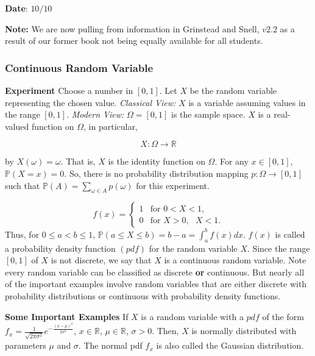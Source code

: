 \documentclass[12pt]{article}
\newcommand{\R}{\mathbb{R}}
\newcommand{\prob}[1]{\mathbb{P}(#1)}
\begin{document}
\begin{flushright}
\textbf{Date}: $10/10$
\end{flushright}

\textbf{Note:} We are now pulling from information in Grinstead and Snell, $v2.2$ as a result of our former book not being equally available for all students.

\subsubsection*{Continuous Random Variable} 

\begin{tcolorbox}
\textbf{Experiment} Choose a number in $[0,1]$. Let $X$ be the random variable representing the chosen value. \textit{Classical View:} $X$ is a variable assuming values in the range $[0,1]$. \textit{Modern View:} $\Omega = [0,1]$ is the sample space. $X$ is a real-valued function on $\Omega$, in particular,

\begin{equation*}
X : \Omega \rightarrow \R
\end{equation*}

\noindent
by $X(\omega) = \omega$. That is, $X$ is the identity function on $\Omega$. For any $x \in [0,1]$, $\prob{X = x} = 0$. So, there is no probability distribution mapping $p : \Omega \rightarrow [0,1]$ such that $\prob{A} = \sum_{\omega \in A} p(\omega)$ for this experiment. 
\end{tcolorbox}

\noindent
\[ f(x) =  \begin{cases} 
      1 & \text{for } 0 < X < 1, \\
      0 & \text{for } X > 0, \text{ } X < 1.
      \end{cases} \] Thus, for $0 \leq a < b \leq 1$, $\prob{a \leq X \leq b} = b-a = \int_{a}^{b} f(x) dx$. $f(x)$ is called a probability density function $(pdf)$ for the random variable $X$. Since the range $[0,1]$ of $X$ is not discrete, we say that $X$ is a continuous random variable. Note every random variable can be classified as discrete \textbf{or} continuous.  
But nearly all of the important examples involve random variables that are either discrete with probability distributions or continuous with probability density functions.

\noindent
\textbf{Some Important Examples}
If $X$ is a random variable with a $pdf$ of the form $f_x = \frac{1}{\sqrt{2 \pi \sigma^2}} e^{- \frac{(x- \mu)^2}{2 \sigma^2}}$, $x \in \R$, $\mu \in \R$, $\sigma > 0$. Then, $X$ is normally distributed with parameters $\mu$ and $\sigma$. The normal pdf $f_x$ is also called the Gaussian distribution. 
\end{document}
